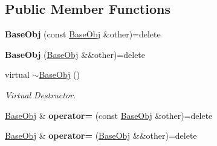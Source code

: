 \subsection*{Public Member Functions}
\begin{DoxyCompactItemize}
\item 
\hypertarget{classhelios_1_1_base_obj_aa4f8943b2f5c935ba33a9fd2800a082a}{}{\bfseries Base\+Obj} (const \hyperlink{classhelios_1_1_base_obj}{Base\+Obj} \&other)=delete\label{classhelios_1_1_base_obj_aa4f8943b2f5c935ba33a9fd2800a082a}

\item 
\hypertarget{classhelios_1_1_base_obj_abc87bfb4698ff77144b8f6c85f5dcf75}{}{\bfseries Base\+Obj} (\hyperlink{classhelios_1_1_base_obj}{Base\+Obj} \&\&other)=delete\label{classhelios_1_1_base_obj_abc87bfb4698ff77144b8f6c85f5dcf75}

\item 
\hypertarget{classhelios_1_1_base_obj_acf317ded8e51f261f61ee230a1a4a548}{}virtual \hyperlink{classhelios_1_1_base_obj_acf317ded8e51f261f61ee230a1a4a548}{$\sim$\+Base\+Obj} ()\label{classhelios_1_1_base_obj_acf317ded8e51f261f61ee230a1a4a548}

\begin{DoxyCompactList}\small\item\em Virtual Destructor. \end{DoxyCompactList}\item 
\hypertarget{classhelios_1_1_base_obj_ac38bad436b81c0deb6ee4d4bdff52e3b}{}\hyperlink{classhelios_1_1_base_obj}{Base\+Obj} \& {\bfseries operator=} (const \hyperlink{classhelios_1_1_base_obj}{Base\+Obj} \&other)=delete\label{classhelios_1_1_base_obj_ac38bad436b81c0deb6ee4d4bdff52e3b}

\item 
\hypertarget{classhelios_1_1_base_obj_af147e65fd18bb77bf4e88123ac704a30}{}\hyperlink{classhelios_1_1_base_obj}{Base\+Obj} \& {\bfseries operator=} (\hyperlink{classhelios_1_1_base_obj}{Base\+Obj} \&\&other)=delete\label{classhelios_1_1_base_obj_af147e65fd18bb77bf4e88123ac704a30}


\end{DoxyCompactItemize}
